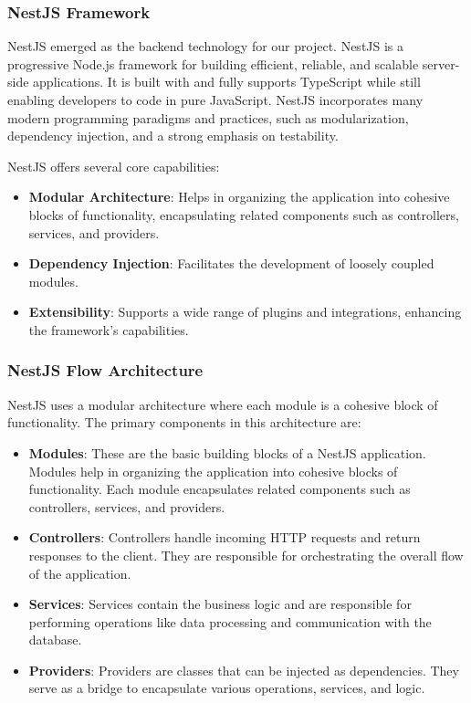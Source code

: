 \subsubsection*{NestJS Framework}
NestJS emerged as the backend technology for our project. NestJS is a progressive Node.js framework for building efficient, reliable, and scalable server-side applications. It is built with and fully supports TypeScript while still enabling developers to code in pure JavaScript. NestJS incorporates many modern programming paradigms and practices, such as modularization, dependency injection, and a strong emphasis on testability.

NestJS offers several core capabilities:
\begin{itemize}
    \item \textbf{Modular Architecture}: Helps in organizing the application into cohesive blocks of functionality, encapsulating related components such as controllers, services, and providers.
    \item \textbf{Dependency Injection}: Facilitates the development of loosely coupled modules.
    \item \textbf{Extensibility}: Supports a wide range of plugins and integrations, enhancing the framework's capabilities.
\end{itemize}

\subsubsection*{NestJS Flow Architecture}
NestJS uses a modular architecture where each module is a cohesive block of functionality. The primary components in this architecture are:

\begin{itemize}
    \item \textbf{Modules}: These are the basic building blocks of a NestJS application. Modules help in organizing the application into cohesive blocks of functionality. Each module encapsulates related components such as controllers, services, and providers.
    \item \textbf{Controllers}: Controllers handle incoming HTTP requests and return responses to the client. They are responsible for orchestrating the overall flow of the application.
    \item \textbf{Services}: Services contain the business logic and are responsible for performing operations like data processing and communication with the database.
    \item \textbf{Providers}: Providers are classes that can be injected as dependencies. They serve as a bridge to encapsulate various operations, services, and logic.
\end{itemize}

